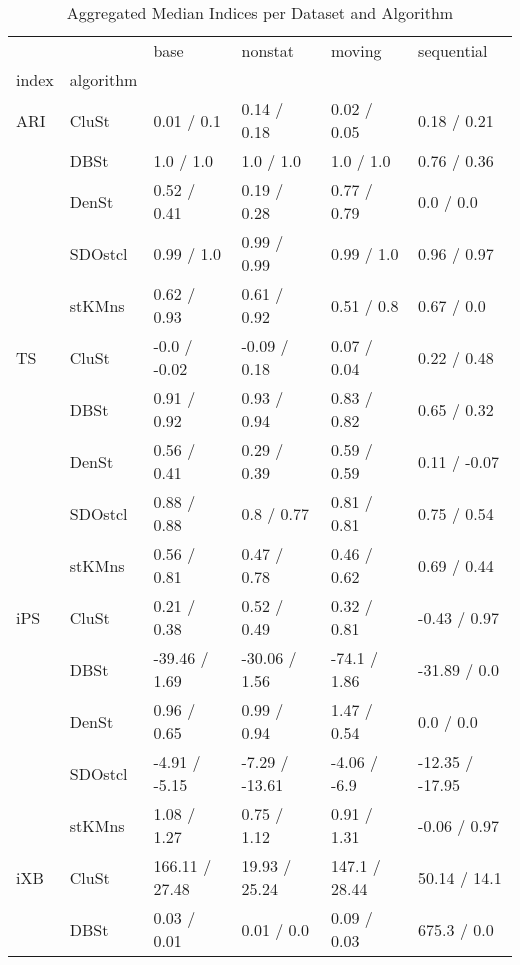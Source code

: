 \begin{table}
\centering
\caption{Aggregated Median Indices per Dataset and Algorithm}
\label{tab:aggregated_median_indices}
\begin{tabular}{llllll}
\toprule
     &        &            base &         nonstat &           moving &       sequential \\
index & algorithm &                 &                 &                  &                  \\
\midrule
ARI & CluSt &      0.01 / 0.1 &     0.14 / 0.18 &      0.02 / 0.05 &      0.18 / 0.21 \\
     & DBSt &       1.0 / 1.0 &       1.0 / 1.0 &        1.0 / 1.0 &      0.76 / 0.36 \\
     & DenSt &     0.52 / 0.41 &     0.19 / 0.28 &      0.77 / 0.79 &        0.0 / 0.0 \\
     & SDOstcl &      0.99 / 1.0 &     0.99 / 0.99 &       0.99 / 1.0 &      0.96 / 0.97 \\
     & stKMns &     0.62 / 0.93 &     0.61 / 0.92 &       0.51 / 0.8 &       0.67 / 0.0 \\
TS & CluSt &    -0.0 / -0.02 &    -0.09 / 0.18 &      0.07 / 0.04 &      0.22 / 0.48 \\
     & DBSt &     0.91 / 0.92 &     0.93 / 0.94 &      0.83 / 0.82 &      0.65 / 0.32 \\
     & DenSt &     0.56 / 0.41 &     0.29 / 0.39 &      0.59 / 0.59 &     0.11 / -0.07 \\
     & SDOstcl &     0.88 / 0.88 &      0.8 / 0.77 &      0.81 / 0.81 &      0.75 / 0.54 \\
     & stKMns &     0.56 / 0.81 &     0.47 / 0.78 &      0.46 / 0.62 &      0.69 / 0.44 \\
iPS & CluSt &     0.21 / 0.38 &     0.52 / 0.49 &      0.32 / 0.81 &     -0.43 / 0.97 \\
     & DBSt &   -39.46 / 1.69 &   -30.06 / 1.56 &     -74.1 / 1.86 &     -31.89 / 0.0 \\
     & DenSt &     0.96 / 0.65 &     0.99 / 0.94 &      1.47 / 0.54 &        0.0 / 0.0 \\
     & SDOstcl &   -4.91 / -5.15 &  -7.29 / -13.61 &     -4.06 / -6.9 &  -12.35 / -17.95 \\
     & stKMns &     1.08 / 1.27 &     0.75 / 1.12 &      0.91 / 1.31 &     -0.06 / 0.97 \\
iXB & CluSt &  166.11 / 27.48 &   19.93 / 25.24 &    147.1 / 28.44 &     50.14 / 14.1 \\
     & DBSt &     0.03 / 0.01 &      0.01 / 0.0 &      0.09 / 0.03 &      675.3 / 0.0 \\

\end{tabular}
\end{table}
